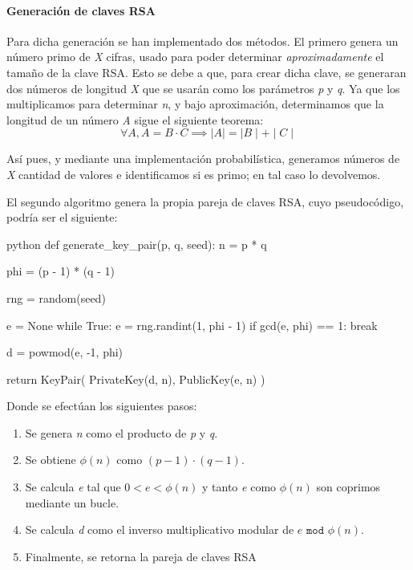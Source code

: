 \paragraph{Generación de claves RSA}
Para dicha generación se han implementado dos métodos. El primero genera un número primo de \textit{X} cifras, usado para poder determinar \textit{aproximadamente} el tamaño de la clave RSA. Esto se debe a que, para crear dicha clave, se generaran dos números de longitud \textit{X} que se usarán como los parámetros \textit{p} y \textit{q}. Ya que los multiplicamos para determinar \textit{n}, y bajo aproximación, determinamos que la longitud de un número \textit{A} sigue el siguiente teorema:
\[\forall A, A = B \cdot C  \implies \mid A \mid  = \mid B\mid + \mid C\mid\]

Así pues, y mediante una implementación probabilística, generamos números de \textit{X} cantidad de valores e identificamos si es primo; en tal caso lo devolvemos.\bigskip

El segundo algoritmo genera la propia pareja de claves RSA, cuyo pseudocódigo, podría ser el siguiente:
\begin{code}{\scriptsize}{python}
def generate_key_pair(p, q, seed):
    n = p * q
    
    phi = (p - 1) * (q - 1)
    
    rng = random(seed)
    
    e = None
    while True:
        e = rng.randint(1, phi - 1)
        if gcd(e, phi) == 1:
            break
    
    d = powmod(e, -1, phi)
    
    return KeyPair(
        PrivateKey(d, n),
        PublicKey(e, n)
    )
\end{code}

Donde se efectúan los siguientes pasos: \begin{enumerate}
    \item Se genera \textit{n} como el producto de \textit{p} y \textit{q}.
    \item Se obtiene $\phi(n)$ como $(p-1)\cdot(q-1)$.
    \item Se calcula \textit{e} tal que $0 < e < \phi(n)$ y tanto \textit{e} como $\phi(n)$ son coprimos mediante un bucle.
    \item Se calcula \textit{d} como el inverso multiplicativo modular\cite{Modular multiplicative inverse} de $e \texttt{ mod } \phi(n)$.
    \item Finalmente, se retorna la pareja de claves RSA
\end{enumerate}\bigskip

